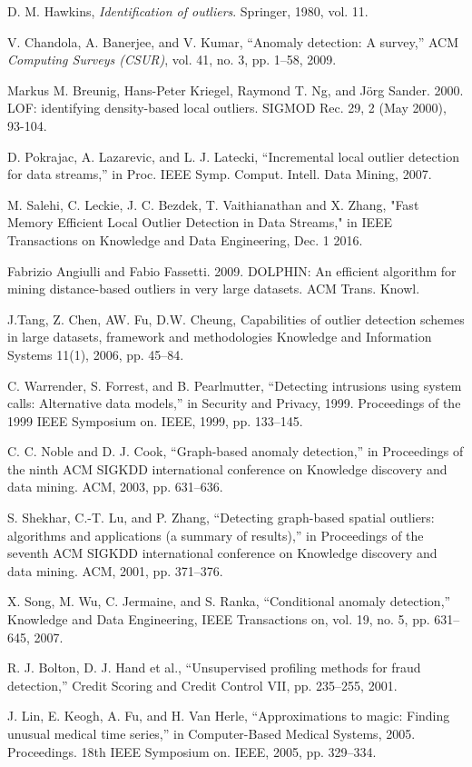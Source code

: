 \begin{thebibliography}{9}
	
	 D. M. Hawkins, \textit{Identification of outliers}. Springer, 1980, vol. 11.
	
	V. Chandola, A. Banerjee, and V. Kumar, “Anomaly detection: A
	survey,” ACM \textit{Computing Surveys (CSUR)}, vol. 41, no. 3, pp. 1–58, 2009.
	
	Markus M. Breunig, Hans-Peter Kriegel, Raymond T. Ng, and Jörg Sander. 2000. LOF: identifying density-based local outliers. SIGMOD Rec. 29, 2 (May 2000), 93-104. 
	
	D. Pokrajac, A. Lazarevic, and L. J. Latecki, “Incremental local outlier
	detection for data streams,” in Proc. IEEE Symp. Comput. Intell.
	Data Mining, 2007.
	
	M. Salehi, C. Leckie, J. C. Bezdek, T. Vaithianathan and X. Zhang, "Fast Memory Efficient Local Outlier Detection in Data Streams," in IEEE Transactions on Knowledge and Data Engineering, Dec. 1 2016.
	
	Fabrizio Angiulli and Fabio Fassetti. 2009. DOLPHIN: An efficient algorithm for mining distance-based outliers in very large datasets. ACM Trans. Knowl.
	
	J.Tang, Z. Chen, AW. Fu, D.W. Cheung, Capabilities of outlier detection schemes in large datasets, framework and methodologies Knowledge and Information Systems 11(1), 2006, pp. 45–84.
	
	C. Warrender, S. Forrest, and B. Pearlmutter, “Detecting intrusions using system calls:
	Alternative data models,” in Security and Privacy, 1999. Proceedings of the 1999 IEEE
	Symposium on. IEEE, 1999, pp. 133–145.
	
	C. C. Noble and D. J. Cook, “Graph-based anomaly detection,” in Proceedings of the ninth ACM
	SIGKDD international conference on Knowledge discovery and data mining. ACM, 2003, pp.
	631–636.
	
	S. Shekhar, C.-T. Lu, and P. Zhang, “Detecting graph-based spatial outliers: algorithms and
	applications (a summary of results),” in Proceedings of the seventh ACM SIGKDD international
	conference on Knowledge discovery and data mining. ACM, 2001, pp. 371–376.
	
	X. Song, M. Wu, C. Jermaine, and S. Ranka, “Conditional anomaly detection,” Knowledge and
	Data Engineering, IEEE Transactions on, vol. 19, no. 5, pp. 631–645, 2007.
	
	R. J. Bolton, D. J. Hand et al., “Unsupervised profiling methods for fraud detection,” Credit
	Scoring and Credit Control VII, pp. 235–255, 2001.
	
	J. Lin, E. Keogh, A. Fu, and H. Van Herle, “Approximations to magic: Finding unusual medical
	time series,” in Computer-Based Medical Systems, 2005. Proceedings. 18th IEEE Symposium on.
	IEEE, 2005, pp. 329–334.
\end{thebibliography}

